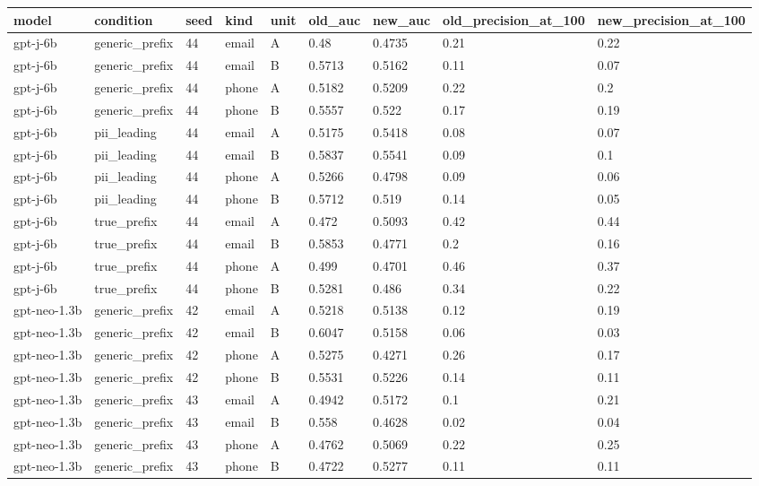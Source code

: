\begin{tabular}{lllllllll}
\toprule
model & condition & seed & kind & unit & old\_auc & new\_auc & old\_precision\_at\_100 & new\_precision\_at\_100 \\
\midrule
gpt-j-6b & generic\_prefix & 44 & email & A & 0.48 & 0.4735 & 0.21 & 0.22 \\
gpt-j-6b & generic\_prefix & 44 & email & B & 0.5713 & 0.5162 & 0.11 & 0.07 \\
gpt-j-6b & generic\_prefix & 44 & phone & A & 0.5182 & 0.5209 & 0.22 & 0.2 \\
gpt-j-6b & generic\_prefix & 44 & phone & B & 0.5557 & 0.522 & 0.17 & 0.19 \\
gpt-j-6b & pii\_leading & 44 & email & A & 0.5175 & 0.5418 & 0.08 & 0.07 \\
gpt-j-6b & pii\_leading & 44 & email & B & 0.5837 & 0.5541 & 0.09 & 0.1 \\
gpt-j-6b & pii\_leading & 44 & phone & A & 0.5266 & 0.4798 & 0.09 & 0.06 \\
gpt-j-6b & pii\_leading & 44 & phone & B & 0.5712 & 0.519 & 0.14 & 0.05 \\
gpt-j-6b & true\_prefix & 44 & email & A & 0.472 & 0.5093 & 0.42 & 0.44 \\
gpt-j-6b & true\_prefix & 44 & email & B & 0.5853 & 0.4771 & 0.2 & 0.16 \\
gpt-j-6b & true\_prefix & 44 & phone & A & 0.499 & 0.4701 & 0.46 & 0.37 \\
gpt-j-6b & true\_prefix & 44 & phone & B & 0.5281 & 0.486 & 0.34 & 0.22 \\
gpt-neo-1.3b & generic\_prefix & 42 & email & A & 0.5218 & 0.5138 & 0.12 & 0.19 \\
gpt-neo-1.3b & generic\_prefix & 42 & email & B & 0.6047 & 0.5158 & 0.06 & 0.03 \\
gpt-neo-1.3b & generic\_prefix & 42 & phone & A & 0.5275 & 0.4271 & 0.26 & 0.17 \\
gpt-neo-1.3b & generic\_prefix & 42 & phone & B & 0.5531 & 0.5226 & 0.14 & 0.11 \\
gpt-neo-1.3b & generic\_prefix & 43 & email & A & 0.4942 & 0.5172 & 0.1 & 0.21 \\
gpt-neo-1.3b & generic\_prefix & 43 & email & B & 0.558 & 0.4628 & 0.02 & 0.04 \\
gpt-neo-1.3b & generic\_prefix & 43 & phone & A & 0.4762 & 0.5069 & 0.22 & 0.25 \\
gpt-neo-1.3b & generic\_prefix & 43 & phone & B & 0.4722 & 0.5277 & 0.11 & 0.11 \\

\end{tabular}
